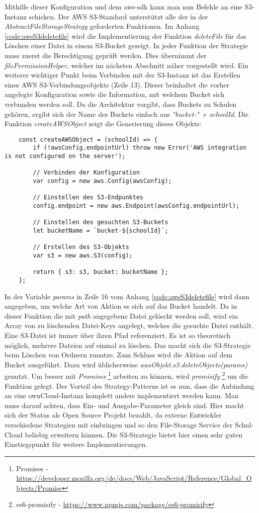 Mithilfe dieser Konfiguration und dem aws-sdk kann man nun Befehle an eine S3-Instanz schicken. Der AWS S3-Standard unterstützt alle der in der \textit{AbstractFileStorageStrategy} geforderten Funktionen. Im Anhang \ref{code:awsS3deletefile} wird die Implementierung der Funktion \textit{deleteFile} für das Löschen einer Datei in einem S3-Bucket gezeigt. In jeder Funktion der Strategie muss zuerst die Berechtigung geprüft werden. Dies übernimmt der \textit{filePermissionHelper}, welcher im nächsten Abschnitt näher vorgestellt wird. Ein weiterer wichtiger Punkt beim Verbinden mit der S3-Instanz ist das Erstellen eines AWS S3-Verbindungsobjekts (Zeile 13). Dieser beinhaltet die vorher angelegte Konfiguration sowie die Information, mit welchem Bucket sich verbunden werden soll. Da die Architektur vorgibt, dass Buckets zu Schulen gehören, ergibt sich der Name des Buckets einfach aus \textit{"bucket-" + schoolId}. Die Funktion \textit{createAWSObject} zeigt die Generierung dieses Objekts:

\begin{lstlisting}
	const createAWSObject = (schoolId) => {
		if (!awsConfig.endpointUrl) throw new Error('AWS integration is not configured on the server');
		
		// Verbinden der Konfiguration
		var config = new aws.Config(awsConfig);
		
		// Einstellen des S3-Endpunktes
		config.endpoint = new aws.Endpoint(awsConfig.endpointUrl);
		
		// Einstellen des gesuchten S3-Buckets
		let bucketName = `bucket-${schoolId}`;
		
		// Erstellen des S3-Objekts
		var s3 = new aws.S3(config);
		
		return { s3: s3, bucket: bucketName };
	};
\end{lstlisting}

In der Variable \textit{params} in Zeile 16 vom Anhang \ref{code:awsS3deletefile} wird dann angegeben, um welche Art von Aktion es sich auf das Bucket handelt. Da in dieser Funktion die mit \textit{path} angegebene Datei gelöscht werden soll, wird ein Array von zu löschenden Datei-Keys angelegt, welches die gesuchte Datei enthält. Eine S3-Datei ist immer über ihren Pfad referenziert. Es ist so theoretisch möglich, mehrere Dateien auf einmal zu löschen. Das macht sich die S3-Strategie beim Löschen von Ordnern zunutze. Zum Schluss wird die Aktion auf dem Bucket ausgeführt. Dazu wird üblicherweise \textit{awsObjekt.s3.deleteObjects(params)} genutzt. Um besser mit \textit{Promises} \footnote{Promises - \url{https://developer.mozilla.org/de/docs/Web/JavaScript/Reference/Global_Objects/Promise}} arbeiten zu können, wird \textit{promisify} \footnote{es6-promisify - \url{https://www.npmjs.com/package/es6-promisify}} um die Funktion gelegt. Der Vorteil des Strategy-Patterns ist es nun, dass die Anbindung an eine ownCloud-Instanz komplett anders implementiert werden kann. Man muss darauf achten, dass Ein- und Ausgabe-Parameter gleich sind. Hier macht sich der Status als Open Source Projekt bezahlt, da externe Entwickler verschiedene Strategien mit einbringen und so den File-Storage Service der Schul-Cloud beliebig erweitern können. Die S3-Strategie bietet hier einen sehr guten Einstiegspunkt für weitere Implementierungen.


